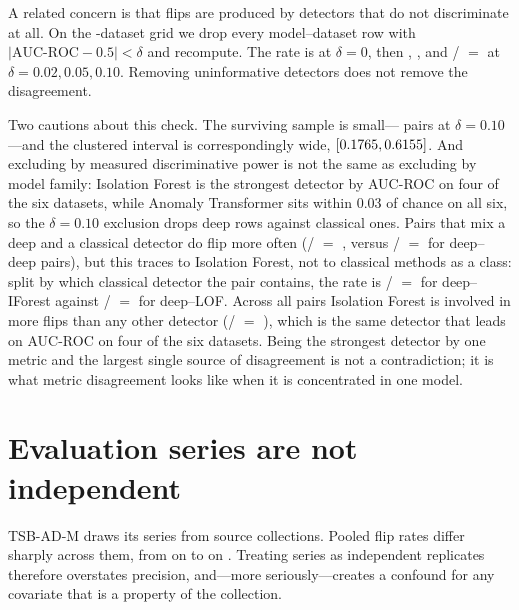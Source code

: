 \documentclass[twoside,11pt]{article}
\newcommand{\auc}{\mbox{AUC-ROC}}
\begin{document}
A related concern is that flips are produced by detectors that do not
discriminate at all. On the \TabDatasets-dataset grid we drop every
model--dataset row with $|\auc{} - 0.5| < \delta$ and recompute. The rate is
\NrRateZeroZero{} at $\delta = 0$, then \NrRateZeroTwo{}, \NrRateZeroFive{}, and
\NrFlipsOneZero/\NrPairsOneZero{} $=$ \NrRateOneZero{} at
$\delta = 0.02, 0.05, 0.10$. Removing uninformative detectors does not remove
the disagreement.

Two cautions about this check. The surviving sample is small---%
\NrPairsOneZero{} pairs at $\delta = 0.10$---and the clustered interval is
correspondingly wide, $[0.1765, 0.6155]$. And excluding by
measured discriminative power is not the same as excluding by model family:
Isolation Forest is the strongest detector by \auc{} on four of the six
datasets, while Anomaly Transformer sits within $0.03$ of chance on all six, so
the $\delta = 0.10$ exclusion drops \NrDeepOneZero{} deep rows against
\NrClsOneZero{} classical ones. Pairs that mix a deep and a classical detector do
flip more often (\ClsDCFlips/\ClsDCPairs{} $=$ \ClsDCRate{}, versus
\ClsDDFlips/\ClsDDPairs{} $=$ \ClsDDRate{} for deep--deep pairs), but this traces
to Isolation Forest, not to classical methods as a class: split by which
classical detector the pair contains, the rate is
\DeepWithIForestFlips/\DeepWithIForestPairs{} $=$ \DeepWithIForestRate{} for
\mbox{deep--IForest} against \DeepWithLOFFlips/\DeepWithLOFPairs{} $=$
\DeepWithLOFRate{} for \mbox{deep--LOF}. Across all
\TabAllAffPairs{} pairs Isolation Forest is involved in more flips than any
other detector (\ModelIForestFlips/\ModelIForestPairs{} $=$
\ModelIForestRate{}), which is the same detector that leads on \auc{} on four
of the six datasets. Being the strongest detector by one metric and the largest
single source of disagreement is not a contradiction; it is what metric
disagreement looks like when it is concentrated in one model.

\section{Evaluation series are not independent}
\label{sec:cluster}

TSB-AD-M draws its \TsbadSeries{} series from \TsbadCollections{} source
collections. Pooled flip rates differ sharply across them, from \CollMinRate{}
on \CollMinName{} to \CollMaxRate{} on \CollMaxName{}. Treating series as
independent replicates therefore overstates precision, and---more
seriously---creates a confound for any covariate that is a property of the
collection.
\end{document}
